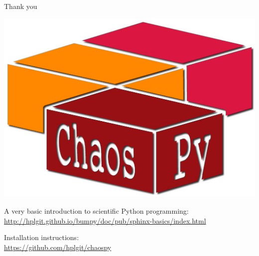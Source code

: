 \documentclass[handout]{beamer}
\begin{document}
 
\begin{frame}[fragile]{Thank you}
  \begin{center}
     \includegraphics[width=.5\textwidth]{chaospy_logo.jpg}
  \end{center}
    \begin{alert}{A very basic introduction to scientific Python programming:}
    \scriptsize
      \href{http://hplgit.github.io/bumpy/doc/pub/sphinx-basics/index.html}{http://hplgit.github.io/bumpy/doc/pub/sphinx-basics/index.html}\\
  \end{alert}
  \begin{alert}{Installation instructions:}\\
  \scriptsize
      \href{https://github.com/hplgit/chaospy}{https://github.com/hplgit/chaospy}\\
  \end{alert}
% 
\end{frame}
\end{document}
